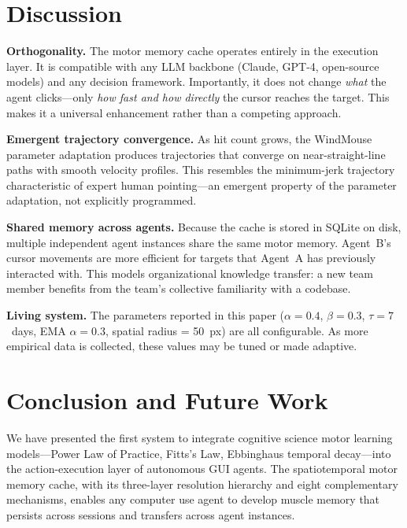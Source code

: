 \documentclass[conference]{IEEEtran}
\begin{document}
\section{Discussion}

\textbf{Orthogonality.} The motor memory cache operates entirely in the execution layer. It is compatible with any LLM backbone (Claude, GPT-4, open-source models) and any decision framework. Importantly, it does not change \emph{what} the agent clicks---only \emph{how fast and how directly} the cursor reaches the target. This makes it a universal enhancement rather than a competing approach.

\textbf{Emergent trajectory convergence.} As hit count grows, the WindMouse parameter adaptation produces trajectories that converge on near-straight-line paths with smooth velocity profiles. This resembles the minimum-jerk trajectory~\cite{soukoreff2004} characteristic of expert human pointing---an emergent property of the parameter adaptation, not explicitly programmed.

\textbf{Shared memory across agents.} Because the cache is stored in SQLite on disk, multiple independent agent instances share the same motor memory. Agent~B's cursor movements are more efficient for targets that Agent~A has previously interacted with. This models organizational knowledge transfer: a new team member benefits from the team's collective familiarity with a codebase.

\textbf{Living system.} The parameters reported in this paper ($\alpha = 0.4$, $\beta = 0.3$, $\tau = 7$~days, EMA $\alpha = 0.3$, spatial radius = 50~px) are all configurable. As more empirical data is collected, these values may be tuned or made adaptive.

\section{Conclusion and Future Work}

We have presented the first system to integrate cognitive science motor learning models---Power Law of Practice, Fitts's Law, Ebbinghaus temporal decay---into the action-execution layer of autonomous GUI agents. The spatiotemporal motor memory cache, with its three-layer resolution hierarchy and eight complementary mechanisms, enables any computer use agent to develop muscle memory that persists across sessions and transfers across agent instances.
\end{document}
